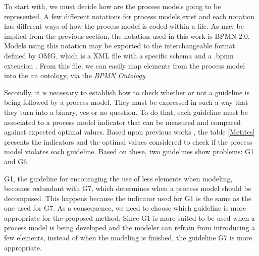 \documentclass[a4paper,twoside]{article}
\begin{document}
To start with, we must decide how are the process models going to be represented. A few different notations for process models exist and each notation has different ways of how the process model is coded within a file. As may be implied from the previous section, the notation used in this work is BPMN 2.0. Models using this notation may be exported to the interchangeable format defined by OMG, which is a XML file with a specific schema and a .bpmn extension \cite{OMGObjectManagementGroup2015}. From this file, we can easily map elements from the process model into the an ontology, via the \textit{BPMN Ontology}.

Secondly, it is necessary to establish how to check whether or not a guideline is being followed by a process model. They must be expressed in such a way that they turn into a binary, yes or no question. To do that, each guideline must be associated to a process model indicator that can be measured and compared against expected optimal values. Based upon previous works \cite{Mendling2008} \cite{Recker2011} \cite{Mendling:2012}, the table \ref{Metrics} presents the indicators and the optimal values considered to check if the process model violates each guideline. Based on these, two guidelines show problems: G1 and G6.



G1, the guideline for encouraging the use of less elements when modeling, becomes redundant with G7, which determines when a process model should be decomposed. This happens because the indicator used for G1 is the same as the one used for G7. As a consequence, we need to choose which guideline is more appropriate for the proposed method. Since G1 is more suited to be used when a process model is being developed and the modeler can refrain from introducing a few elements, instead of when the modeling is finished, the guideline G7 is more appropriate.
\end{document}
